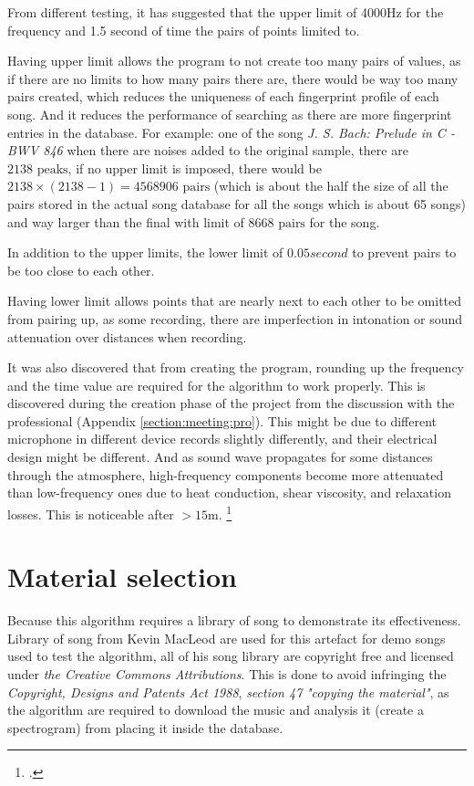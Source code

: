 From different testing, it has suggested that the upper limit of 4000Hz for the frequency and 1.5 second of time the pairs of points limited to. 

Having upper limit allows the program to not create too many pairs of values, as if there are no limits to how many pairs there are, there would be way too many pairs created, which reduces the uniqueness of each fingerprint profile of each song. And it reduces the performance of searching as there are more fingerprint entries in the database. For example: one of the song \textit{J. S. Bach: Prelude in C - BWV 846} when there are noises added to the original sample, there are $2138 \text{ peaks}$, if no upper limit is imposed, there would be $2138 \times (2138 - 1) = 4568906\text{ pairs}$ (which is about the half the size of all the pairs stored in the actual song database for all the songs which is about 65 songs) and way larger than the final with limit of $8668 \text{ pairs}$ for the song. 

In addition to the upper limits, the lower limit of $0.05 second$ to prevent pairs to be too close to each other. 

Having lower limit allows points that are nearly next to each other to be omitted from pairing up, as some recording, there are imperfection in intonation or sound attenuation over distances when recording.

It was also discovered that from creating the program, rounding up the frequency and the time value are required for the algorithm to work properly. This is discovered during the creation phase of the project from the discussion with the professional (Appendix \autoref{section:meeting:pro}). This might be due to different microphone in different device records slightly differently, and their electrical design might be different. And as sound wave propagates for some distances through the atmosphere, high-frequency components become more attenuated than low-frequency ones due to heat conduction, shear viscosity, and relaxation losses. This is noticeable after $>15 \unit{\meter}$. \footcite{spiousas_sound_2017}

\section{Material selection}
Because this algorithm requires a library of song to demonstrate its effectiveness. Library of song from Kevin MacLeod are used for this artefact for demo songs used to test the algorithm, all of his song library are copyright free and licensed under \textit{the Creative Commons Attributions}. This is done to avoid infringing the \textit{Copyright, Designs and Patents Act 1988}, \textit{section 47} \textit{"copying the material"}, as the algorithm are required to download the music and analysis it (create a spectrogram) from placing it inside the database. 

